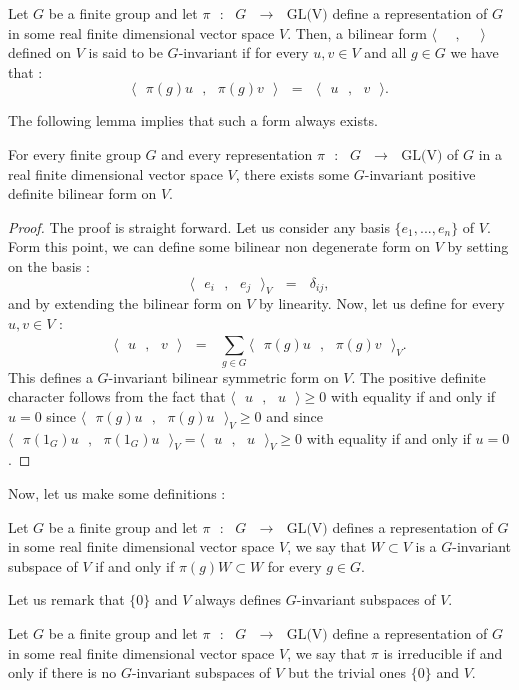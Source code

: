 \documentclass[envcountsame,envcountchap]{svmono}
\newcommand{\sub}{\subset}
\newcommand{\s}[2]{\sum\limits_{#1}^{#2}}
\newcommand{\prods}[2]{\langle\qq #1\qq,\qq#2\qq\rangle}
\newcommand{\qq}{\text{ }}
\newcommand{\fctt}[2]{\qq:\qq#1\qq\rightarrow\qq#2}
\begin{document}
\begin{definition}
	Let $G$ be a finite group and let $\pi \fctt{G}{\mbox{GL(V)}}$ define a representation of $G$ in some real finite dimensional vector space $V$. Then, a bilinear form $\prods{}{}$ defined on $V$ is said to be $G$-invariant if for every $u,v\in V$ and all $g\in G$ we have that :
	\begin{equation}
	\prods{\pi(g)u}{\pi(g)v}\qq=\qq \prods{u}{v}.
	\end{equation}
\end{definition}
The following lemma implies that such a form always exists. 
\begin{lemma}\label{existence of a g invariant non degenerate bilinear form on the representaion sapce}
	For every finite group $G$ and every representation $\pi \fctt{G}{\mbox{GL(V)}}$ of $G$ in a real finite dimensional vector space $V$, there exists some $G$-invariant positive definite bilinear form on $V$.
\end{lemma}
\begin{proof}
	The proof is straight forward. Let us consider any basis $\{e_1,...,e_n\}$ of $V$. Form this point, we can define some bilinear non degenerate form on $V$ by setting on the basis :
	\begin{equation}
	\prods{e_i}{e_j}_V\qq=\qq \delta_{ij},
	\end{equation}
	and by extending the bilinear form on $V$ by linearity. Now, let us define for every $u,v\in V$ :
	\begin{equation}
	\prods{u}{v}\qq=\qq \s{g\in G}{}\prods{\pi(g)u}{\pi(g)v}_V.
	\end{equation} 
	This defines a $G$-invariant bilinear symmetric form on $V$. The positive definite character follows from the fact that $\prods{u}{u}\geq 0$ with equality if and only if $u=0$ since $\prods{\pi(g)u}{\pi(g)u}_V\geq 0$ and since $\prods{\pi(1_G)u}{\pi(1_G)u}_V=\prods{u}{u}_V\geq 0$ with equality if and only if $u=0$.
\end{proof}
Now, let us make some definitions :
\begin{definition}
	Let $G$ be a finite group and let $\pi \fctt{G}{\mbox{GL(V)}}$ defines a representation of $G$ in some real finite dimensional vector space $V$, we say that $W\sub V$ is a $G$-invariant subspace of $V$ if and only if $\pi(g)W\sub W$ for every $g\in G$.
\end{definition} 
Let us remark that $\{0\}$ and $V$ always defines $G$-invariant subspaces of $V$.
\begin{definition}
	Let $G$ be a finite group and let $\pi \fctt{G}{\mbox{GL(V)}}$ define a representation of $G$ in some real finite dimensional vector space $V$, we say that $\pi$ is irreducible if and only if there is no $G$-invariant subspaces of $V$ but the trivial ones $\{0\}$ and $V$.
\end{definition} 
\end{document}
